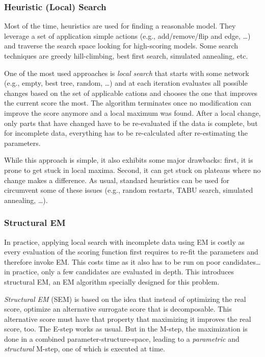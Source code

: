			\subsubsection{Heuristic (Local) Search}
				Most of the time, heuristics are used for finding a reasonable model. They leverage a set of application simple actions (e.g., add/remove/flip and edge, \dots) and traverse the search space looking for high-scoring models. Some search techniques are greedy hill-climbing, best first search, simulated annealing, etc.

				One of the most used approaches is \emph{local search} that starts with some network (e.g., empty, best tree, random, \dots) and at each iteration evaluates all possible changes based on the set of applicable cations and chooses the one that improves the current score the most. The algorithm terminates once no modification can improve the score anymore and a local maximum was found. After a local change, only parts that have changed have to be re-evaluated if the data is complete, but for incomplete data, everything has to be re-calculated after re-estimating the parameters.

				While this approach is simple, it also exhibits some major drawbacks: first, it is prone to get stuck in local maxima. Second, it can get stuck on plateaus where no change makes a difference. As usual, standard heuristics can be used for circumvent some of these issues (e.g., random restarts, TABU search, simulated annealing, \dots).

			\subsubsection{Structural EM}
				In practice, applying local search with incomplete data using EM is costly as every evaluation of the scoring function first requires to re-fit the parameters and therefore invoke EM. This costs time as it also has to be run on poor candidates\dots in practice, only a few candidates are evaluated in depth. This introduces structural EM, an EM algorithm specially designed for this problem.

				\emph{Structural EM} (SEM) is based on the idea that instead of optimizing the real score, optimize an alternative surrogate score that is decomposable. This alternative score must have that property that maximizing it improves the real score, too. The E-step works as usual. But in the M-step, the maximization is done in a combined parameter-structure-space, leading to a \emph{parametric} and \emph{structural} M-step, one of which is executed at time.

